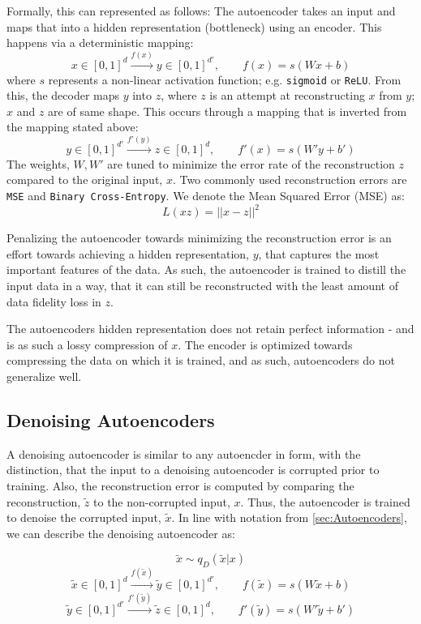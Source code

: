 Formally, this can represented as follows: The autoencoder takes an input and maps that into a hidden representation (bottleneck) using an encoder. This happens via a deterministic mapping: 
$$
x\in[0,1]^{d} \xrightarrow{\text{$f(x)$}} y\in[0,1]^{d'}, \quad \quad f(x) = s(Wx + b)
$$
where $s$ represents a non-linear activation function; e.g. \texttt{sigmoid} or \texttt{ReLU}. 
From this, the decoder maps $y$ into $z$, where $z$ is an attempt at reconstructing $x$ from $y$; $x$ and $z$ are of same shape. This occurs through a mapping that is inverted from the mapping stated above:
$$
y\in[0,1]^{d'} \xrightarrow{\text{$f'(y)$}} z\in[0,1]^{d}, \quad \quad f'(x) = s(W'y + b')
$$
The weights, $W, W'$ are tuned to minimize the error rate of the reconstruction $z$ compared to the original input, $x$. Two commonly used reconstruction errors are \texttt{MSE} and \texttt{Binary Cross-Entropy}.
We denote the Mean Squared Error (MSE) as:
$$
L(xz) = ||x-z||^{2}
$$

Penalizing the autoencoder towards minimizing the reconstruction error is an effort towards achieving a hidden representation, $y$, that captures the most important features of the data.
As such, the autoencoder is trained to distill the input data in a way, that it can still be reconstructed with the least amount of data fidelity loss in $z$.

The autoencoders hidden representation does not retain perfect information - and is as such a lossy compression of $x$. 
The encoder is optimized towards compressing the data on which it is trained, and as such, autoencoders do not generalize well. 

\subsection{Denoising Autoencoders}
A denoising autoencoder is similar to any autoencder in form, with the distinction, that the input to a denoising autoencoder is corrupted prior to training.
Also, the reconstruction error is computed by comparing the reconstruction, $\widetilde{z}$ to the non-corrupted input, $x$. 
Thus, the autoencoder is trained to denoise the corrupted input, $\widetilde{x}$. In line with notation from \autoref{sec:Autoencoders}, we can describe the denoising autoencoder as:

$$
\widetilde{x} \sim q_{D}(\widetilde{x}|x) 
$$
$$
\widetilde{x}\in[0,1]^{d} \xrightarrow{\text{$f(\widetilde{x})$}} \widetilde{y}\in[0,1]^{d'}, \quad \quad f(\widetilde{x}) = s(W\widetilde{x} + b)
$$
$$
\widetilde{y}\in[0,1]^{d'} \xrightarrow{\text{$f'(\widetilde{y})$}} \widetilde{z}\in[0,1]^{d}, \quad \quad f'(\widetilde{y}) = s(W'\widetilde{y} + b')
$$

